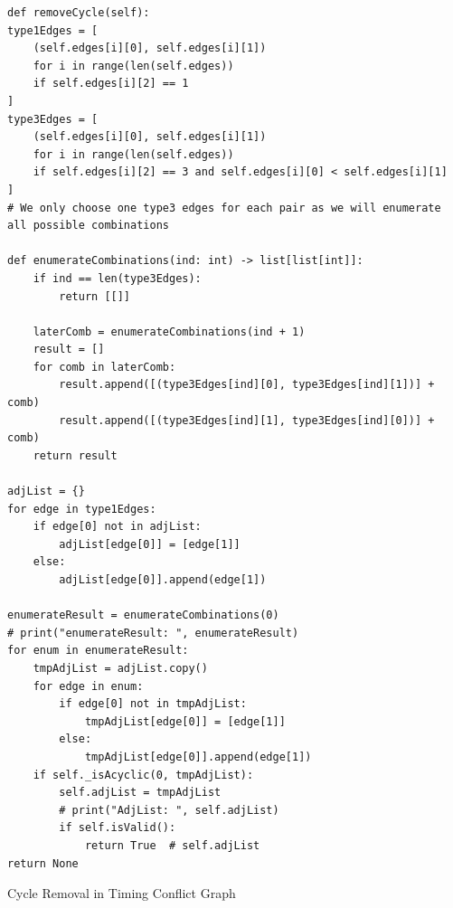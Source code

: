 \documentclass{article}
\begin{document}
\begin{listing}[H]
    \begin{verbatim}
def removeCycle(self):
type1Edges = [
    (self.edges[i][0], self.edges[i][1])
    for i in range(len(self.edges))
    if self.edges[i][2] == 1
]
type3Edges = [
    (self.edges[i][0], self.edges[i][1])
    for i in range(len(self.edges))
    if self.edges[i][2] == 3 and self.edges[i][0] < self.edges[i][1]
]
# We only choose one type3 edges for each pair as we will enumerate all possible combinations

def enumerateCombinations(ind: int) -> list[list[int]]:
    if ind == len(type3Edges):
        return [[]]

    laterComb = enumerateCombinations(ind + 1)
    result = []
    for comb in laterComb:
        result.append([(type3Edges[ind][0], type3Edges[ind][1])] + comb)
        result.append([(type3Edges[ind][1], type3Edges[ind][0])] + comb)
    return result

adjList = {}
for edge in type1Edges:
    if edge[0] not in adjList:
        adjList[edge[0]] = [edge[1]]
    else:
        adjList[edge[0]].append(edge[1])

enumerateResult = enumerateCombinations(0)
# print("enumerateResult: ", enumerateResult)
for enum in enumerateResult:
    tmpAdjList = adjList.copy()
    for edge in enum:
        if edge[0] not in tmpAdjList:
            tmpAdjList[edge[0]] = [edge[1]]
        else:
            tmpAdjList[edge[0]].append(edge[1])
    if self._isAcyclic(0, tmpAdjList):
        self.adjList = tmpAdjList
        # print("AdjList: ", self.adjList)
        if self.isValid():
            return True  # self.adjList
return None
    \end{verbatim}
    \caption{Cycle Removal in Timing Conflict Graph}
    \label{lst:cycle-removal}
\end{listing}
\end{document}
